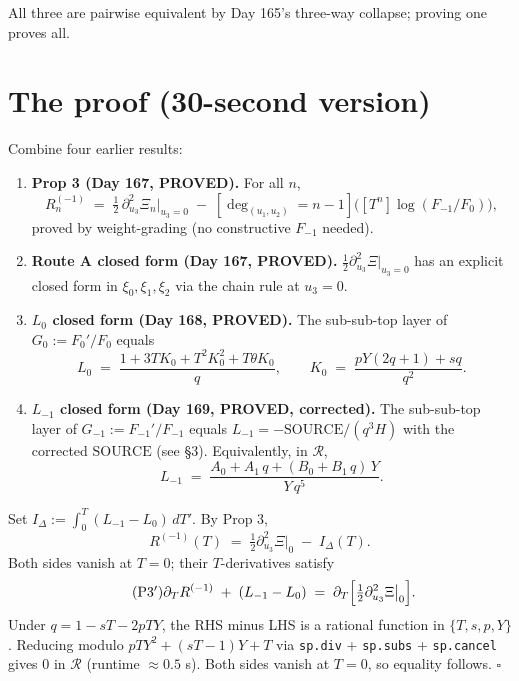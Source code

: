 \documentclass[11pt]{article}
\newcommand{\R}{\mathcal{R}}
\newcommand{\SOURCE}{\mathrm{SOURCE}}
\begin{document}
All three are pairwise equivalent by Day 165's three-way collapse; proving one proves all.

\section{The proof (30-second version)}

Combine four earlier results:

\begin{enumerate}
  \item \textbf{Prop 3 (Day 167, PROVED).} For all $n$,
  $$R^{(-1)}_n \;=\; \tfrac{1}{2}\,\partial_{u_3}^2 \Xi_n\big|_{u_3=0} \;-\; [\deg_{(u_1,u_2)} = n{-}1]\bigl([T^n]\log(F_{-1}/F_0)\bigr),$$
  proved by weight-grading (no constructive $F_{-1}$ needed).

  \item \textbf{Route A closed form (Day 167, PROVED).} $\tfrac{1}{2}\partial_{u_3}^2 \Xi|_{u_3=0}$ has an explicit closed form in $\xi_0, \xi_1, \xi_2$ via the chain rule at $u_3 = 0$.

  \item \textbf{$L_0$ closed form (Day 168, PROVED).} The sub-sub-top layer of $G_0 := F_0'/F_0$ equals
  $$L_0 \;=\; \frac{1 + 3 T K_0 + T^2 K_0^2 + T \theta K_0}{q}, \qquad K_0 \;=\; \frac{p Y (2q+1) + s q}{q^2}.$$

  \item \textbf{$L_{-1}$ closed form (Day 169, PROVED, corrected).} The sub-sub-top layer of $G_{-1} := F_{-1}'/F_{-1}$ equals $L_{-1} = -\SOURCE/(q^3 H)$ with the corrected $\SOURCE$ (see \S 3). Equivalently, in $\R$,
  $$L_{-1} \;=\; \frac{A_0 + A_1\, q + (B_0 + B_1\, q)\, Y}{Y\, q^5}.$$
\end{enumerate}

Set $I_\Delta := \int_0^T (L_{-1} - L_0)\, dT'$. By Prop 3,
\begin{equation}\tag{P3}
R^{(-1)}(T) \;=\; \tfrac{1}{2}\partial_{u_3}^2 \Xi\big|_0 \;-\; I_\Delta(T).
\end{equation}
Both sides vanish at $T=0$; their $T$-derivatives satisfy
\begin{equation}\tag{P3$'$}
\partial_T R^{(-1)} \;+\; (L_{-1} - L_0) \;=\; \partial_T\Bigl[\tfrac{1}{2}\partial_{u_3}^2 \Xi\big|_0\Bigr].
\end{equation}
Under $q = 1 - sT - 2pTY$, the RHS minus LHS is a rational function in $\{T, s, p, Y\}$. Reducing modulo $pTY^2 + (sT-1)Y + T$ via \texttt{sp.div} + \texttt{sp.subs} + \texttt{sp.cancel} gives $0$ in $\R$ (runtime $\approx 0.5$ s). Both sides vanish at $T=0$, so equality follows. $\square$
\end{document}
